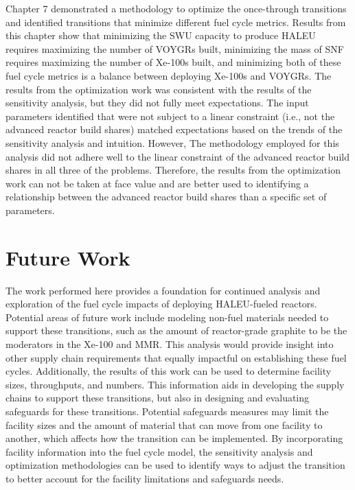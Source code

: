 Chapter 7 demonstrated a methodology to optimize the once-through 
transitions and identified transitions that minimize different 
fuel cycle metrics. Results from this chapter show that minimizing the 
\gls{SWU} capacity to produce \gls{HALEU} requires maximizing the number of 
VOYGRs built, minimizing the mass of \gls{SNF} requires maximizing the number 
of Xe-100s built, and minimizing both of these fuel cycle metrics is a 
balance between deploying Xe-100s and VOYGRs. The results from the optimization 
work was consistent with the results of the sensitivity analysis, but 
they did not fully meet expectations. The input parameters identified that 
were not subject to a linear constraint (i.e., not the advanced reactor 
build shares) matched expectations based on the trends of the sensitivity 
analysis and intuition. However, The methodology employed for this 
analysis did not adhere well to the linear constraint of the advanced reactor 
build shares in all three of the problems. Therefore, the 
results from the optimization work can not be taken at face value 
and are better used to identifying a relationship between the advanced 
reactor build shares than a specific set of parameters. 


 
\section{Future Work}
The work performed here provides a foundation for continued analysis and 
exploration of the fuel cycle impacts of deploying \gls{HALEU}-fueled reactors. 
Potential areas of future work include modeling non-fuel materials needed 
to support these transitions, such as the amount of reactor-grade graphite 
to be the moderators in the Xe-100 and \gls{MMR}. This analysis would 
provide insight into other supply chain requirements that equally 
impactful on establishing these fuel cycles. Additionally, the 
results of this work can be used to determine facility sizes, throughputs, 
and numbers. This information aids in developing the supply chains 
to support these transitions, but also in designing and evaluating 
safeguards for these transitions. Potential safeguards measures may 
limit the facility sizes and the amount of material that can move from 
one facility to another, which affects how the transition can be 
implemented. By 
incorporating facility information into the fuel cycle model, the 
sensitivity analysis and optimization methodologies can be used 
to identify ways to adjust the transition to better account for 
the facility limitations and safeguards needs. 

